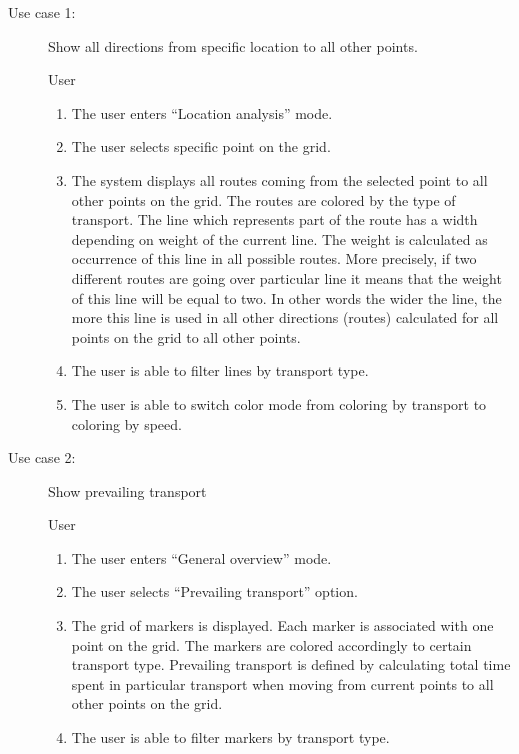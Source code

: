 \begin{description}
  \item[Use case 1:] Show all directions from specific location to all other points.

  \underline{} User

  \underline{}
  \begin{enumerate}
    \item The user enters ``Location analysis'' mode.
    \item The user selects specific point on the grid.
    \item The system displays all routes coming from the selected point to all other points on the
    grid. The routes are colored by the type of transport. The line which represents part
    of the route has a width depending on weight of the current line. The weight is calculated
    as occurrence of this line in all possible routes. More precisely, if two different
    routes are going over particular line it means that the weight of this line will
    be equal to two. In other words the wider the line, the more this line is used in all other
    directions (routes) calculated for all points on the grid to all other points.
    \item The user is able to filter lines by transport type.
    \item The user is able to switch color mode from coloring by transport to
    coloring by speed.
  \end{enumerate}

  \item[Use case 2:] Show prevailing transport

  \underline{} User

  \underline{}
  \begin{enumerate}
    \item The user enters ``General overview'' mode.
    \item The user selects ``Prevailing transport'' option.
    \item The grid of markers is displayed. Each marker is associated with one
    point on the grid. The markers are colored accordingly to certain transport type. Prevailing
    transport is defined by calculating total time spent in particular transport when
    moving from current points to all other points on the grid.
    \item The user is able to filter markers by transport type.
  \end{enumerate}


\end{description}
